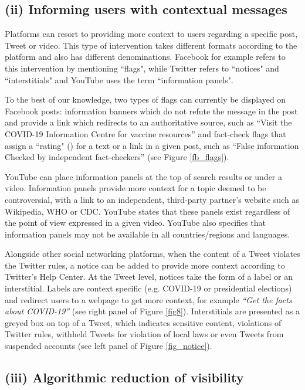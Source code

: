 \documentclass[Afour,sageh,times]{sagej}
\begin{document}
\subsection{(ii) Informing users with contextual messages}

Platforms can resort to providing more context to users regarding a specific post, Tweet or video. This type of intervention takes different formats according to the platform and also has different denominations. Facebook for example refers to this intervention by mentioning ``flags", while Twitter  refers to ``notices" and ``interstitials" and YouTube uses the term ``information panels".
 
To the best of our knowledge, two types of flags can currently be displayed on Facebook posts: information banners which do not refute the message in the post and provide a link which redirects to an authoritative source, such as ``Visit the COVID-19 Information Centre for vaccine resources'' and fact-check flags that assign a ``rating" (\cite{facebookratings}) for a text or a link in a given post, such as ``False information Checked by independent fact-checkers'' (see Figure \ref{fb_flags}). 

YouTube can place information panels at the top of search results or under a video. 
Information panels provide more context for  a topic deemed to be controversial, with a link to an independent, third-party partner's website such as Wikipedia, WHO or CDC. 
YouTube states that these panels exist regardless of the point of view expressed in a given video. 
YouTube also specifies that information panels may not be available in all countries/regions and languages. 

Alongside other social networking platforms, when the content of a Tweet violates the Twitter rules, a notice can be added to provide more context according to Twitter's Help Center. 
At the Tweet level, notices take the form of a label or an interstitial. Labels are context specific (e.g. COVID-19 or presidential elections) and  redirect users to a webpage to get more context, for example {\it ``Get the facts about COVID-19''} (see right panel of Figure \ref{fig8}). 
Interstitials are presented as a greyed box on top of a Tweet, which indicates sensitive content, violations of Twitter rules, withheld Tweets for violation of local laws or even Tweets from suspended accounts (see left panel of Figure \ref{fig_notice}).

\subsection{(iii) Algorithmic reduction of visibility}
\end{document}
